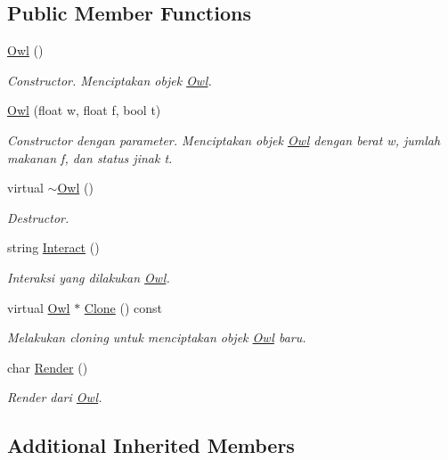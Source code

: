 \subsection*{Public Member Functions}
\begin{DoxyCompactItemize}
\item 
\hyperlink{classOwl_a0a5c549eb9ac3099f04dbcea78c79f6a}{Owl} ()
\begin{DoxyCompactList}\small\item\em Constructor. Menciptakan objek \hyperlink{classOwl}{Owl}. \end{DoxyCompactList}\item 
\hyperlink{classOwl_abdec4b1b8d1f146b55175bae78888a1d}{Owl} (float w, float f, bool t)
\begin{DoxyCompactList}\small\item\em Constructor dengan parameter. Menciptakan objek \hyperlink{classOwl}{Owl} dengan berat w, jumlah makanan f, dan status jinak t. \end{DoxyCompactList}\item 
virtual \hyperlink{classOwl_af8238b610fbfd53c4d3153fb2d993ab7}{$\sim$\+Owl} ()
\begin{DoxyCompactList}\small\item\em Destructor. \end{DoxyCompactList}\item 
string \hyperlink{classOwl_ac3c735f8a34b46780a0efd052319e7f3}{Interact} ()
\begin{DoxyCompactList}\small\item\em Interaksi yang dilakukan \hyperlink{classOwl}{Owl}. \end{DoxyCompactList}\item 
virtual \hyperlink{classOwl}{Owl} $\ast$ \hyperlink{classOwl_a585e73d53d76b2db489613b7f0b6eecc}{Clone} () const 
\begin{DoxyCompactList}\small\item\em Melakukan cloning untuk menciptakan objek \hyperlink{classOwl}{Owl} baru. \end{DoxyCompactList}\item 
char \hyperlink{classOwl_ab4ecc1fc8da822f97299709508f7806d}{Render} ()
\begin{DoxyCompactList}\small\item\em Render dari \hyperlink{classOwl}{Owl}. \end{DoxyCompactList}\end{DoxyCompactItemize}
\subsection*{Additional Inherited Members}


